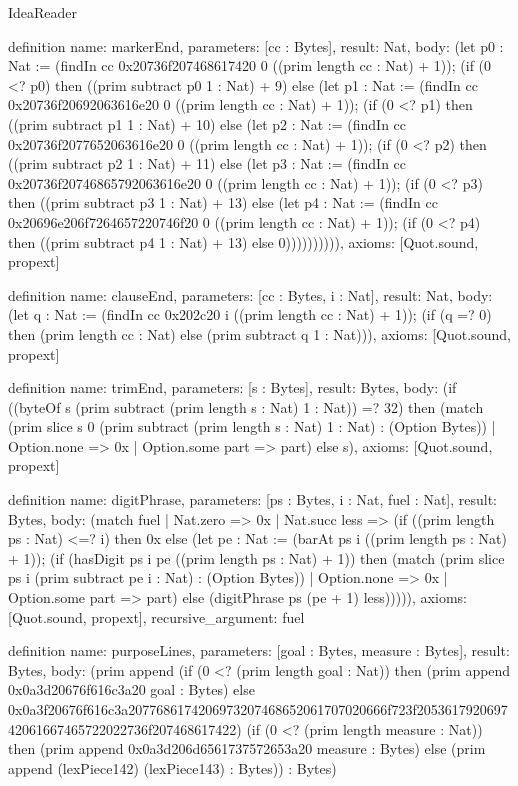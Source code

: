 \begin{lexlean}{IdeaReader}
\begin{semanticmodule}
definition{
  name: markerEnd,
  parameters: [cc : Bytes],
  result: Nat,
  body: (let p0 : Nat := (findIn cc 0x20736f207468617420 0 ((prim length cc : Nat) + 1)); (if (0 <? p0) then ((prim subtract p0 1 : Nat) + 9) else (let p1 : Nat := (findIn cc 0x20736f20692063616e20 0 ((prim length cc : Nat) + 1)); (if (0 <? p1) then ((prim subtract p1 1 : Nat) + 10) else (let p2 : Nat := (findIn cc 0x20736f2077652063616e20 0 ((prim length cc : Nat) + 1)); (if (0 <? p2) then ((prim subtract p2 1 : Nat) + 11) else (let p3 : Nat := (findIn cc 0x20736f20746865792063616e20 0 ((prim length cc : Nat) + 1)); (if (0 <? p3) then ((prim subtract p3 1 : Nat) + 13) else (let p4 : Nat := (findIn cc 0x20696e206f7264657220746f20 0 ((prim length cc : Nat) + 1)); (if (0 <? p4) then ((prim subtract p4 1 : Nat) + 13) else 0)))))))))),
  axioms: [Quot.sound, propext]
}

definition{
  name: clauseEnd,
  parameters: [cc : Bytes, i : Nat],
  result: Nat,
  body: (let q : Nat := (findIn cc 0x202c20 i ((prim length cc : Nat) + 1)); (if (q =? 0) then (prim length cc : Nat) else (prim subtract q 1 : Nat))),
  axioms: [Quot.sound, propext]
}

definition{
  name: trimEnd,
  parameters: [s : Bytes],
  result: Bytes,
  body: (if ((byteOf s (prim subtract (prim length s : Nat) 1 : Nat)) =? 32) then (match (prim slice s 0 (prim subtract (prim length s : Nat) 1 : Nat) : (Option Bytes))
    | Option.none => 0x
    | Option.some part => part) else s),
  axioms: [Quot.sound, propext]
}

definition{
  name: digitPhrase,
  parameters: [ps : Bytes, i : Nat, fuel : Nat],
  result: Bytes,
  body: (match fuel
    | Nat.zero => 0x
    | Nat.succ less => (if ((prim length ps : Nat) <=? i) then 0x else (let pe : Nat := (barAt ps i ((prim length ps : Nat) + 1)); (if (hasDigit ps i pe ((prim length ps : Nat) + 1)) then (match (prim slice ps i (prim subtract pe i : Nat) : (Option Bytes))
      | Option.none => 0x
      | Option.some part => part) else (digitPhrase ps (pe + 1) less))))),
  axioms: [Quot.sound, propext],
  recursive_argument: fuel
}

definition{
  name: purposeLines,
  parameters: [goal : Bytes, measure : Bytes],
  result: Bytes,
  body: (prim append (if (0 <? (prim length goal : Nat)) then (prim append 0x0a3d20676f616c3a20 goal : Bytes) else 0x0a3f20676f616c3a2077686174206973207468652061707020666f723f205361792069742061667465722022736f207468617422) (if (0 <? (prim length measure : Nat)) then (prim append 0x0a3d206d6561737572653a20 measure : Bytes) else (prim append (lexPiece142) (lexPiece143) : Bytes)) : Bytes)
}


\end{semanticmodule}
\end{lexlean}
